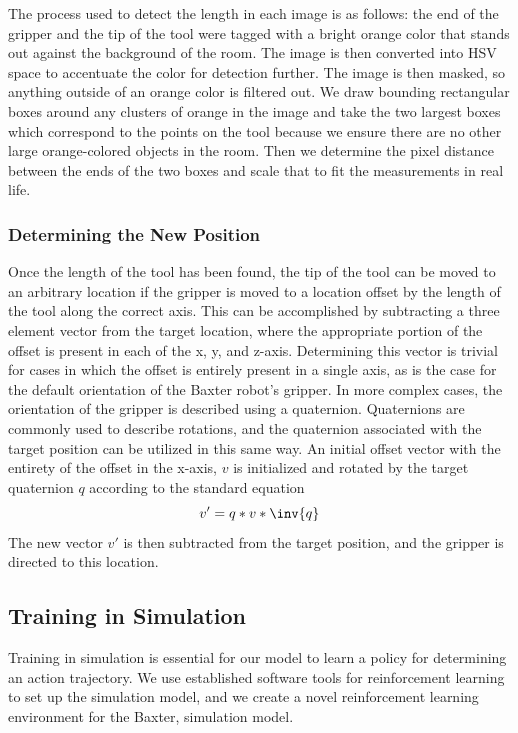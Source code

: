 \documentclass[conference]{IEEEtran}
\begin{document}
The process used to detect the length in each image is as follows: the end of the gripper and the tip of the tool were tagged with a bright orange color that stands out against the background of the room. The image is then converted into HSV space to accentuate the color for detection further. The image is then masked, so anything outside of an orange color is filtered out. We draw bounding rectangular boxes around any clusters of orange in the image and take the two largest boxes which correspond to the points on the tool because we ensure there are no other large orange-colored objects in the room. Then we determine the pixel distance between the ends of the two boxes and scale that to fit the measurements in real life.

\vspace{2mm}
\subsubsection{Determining the New Position}
Once the length of the tool has been found, the tip of the tool can be moved to an arbitrary location if the gripper is moved to a location offset by the length of the tool along the correct axis. This can be accomplished by subtracting a three element vector from the target location, where the appropriate portion of the offset is present in each of the x, y, and z-axis. Determining this vector is trivial for cases in which the offset is entirely present in a single axis, as is the case for the default orientation of the Baxter robot's gripper. In more complex cases, the orientation of the gripper is described using a quaternion. Quaternions are commonly used to describe rotations, and the quaternion associated with the target position can be utilized in this same way. An initial offset vector with the entirety of the offset in the x-axis, $v$ is initialized and rotated by the target quaternion $q$ according to the standard equation
\begin{equation*}
    v' = q*v*\inv{q}
\end{equation*}
The new vector $v'$ is then subtracted from the target position, and the gripper is directed to this location. 

\subsection{Training in Simulation}
Training in simulation is essential for our model to learn a policy for determining an action trajectory. We use established software tools for reinforcement learning to set up the simulation model, and we create a novel reinforcement learning environment for the Baxter, simulation model.
\end{document}
